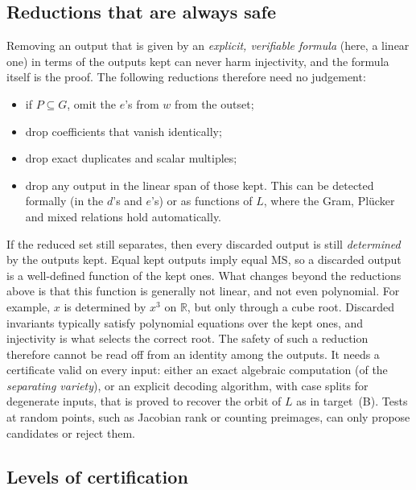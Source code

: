 \documentclass[11pt]{article}
\theoremstyle{definition}
\theoremstyle{remark}
\newcommand{\MS}{\mathrm{MS}}
\begin{document}
\subsection{Reductions that are always safe}

Removing an output that is given by an \emph{explicit, verifiable formula}
(here, a linear one) in terms of the outputs kept can never harm injectivity,
and the formula itself is the proof. The following reductions therefore need
no judgement:
\begin{itemize}
  \item if $P \subseteq G$, omit the $e$'s from $w$ from the outset;
  \item drop coefficients that vanish identically;
  \item drop exact duplicates and scalar multiples;
  \item drop any output in the linear span of those kept. This can be detected
    formally (in the $d$'s and $e$'s) or as functions of $L$, where the
    Gram, Plücker and mixed relations hold automatically.
\end{itemize}
If the reduced set still separates, then every discarded output is still
\emph{determined} by the outputs kept. Equal kept outputs imply equal $\MS$, so
a discarded output is a well-defined function of the kept ones. What changes
beyond the reductions above is that this function is generally not linear,
and not even polynomial. For example, $x$ is determined by $x^3$ on
$\mathbb{R}$, but only through a cube root. Discarded invariants typically
satisfy polynomial equations over the kept ones, and injectivity is what
selects the correct root. The safety of such a reduction therefore cannot be
read off from an identity among the outputs. It needs a certificate valid on
every input: either an exact algebraic computation (of the \emph{separating
variety}), or an explicit decoding algorithm, with case splits for degenerate
inputs, that is proved to recover the orbit of $L$ as in target~(B). Tests at
random points, such as Jacobian rank or counting preimages, can only propose
candidates or reject them.

\subsection{Levels of certification}\label{sec:levels}
\end{document}
